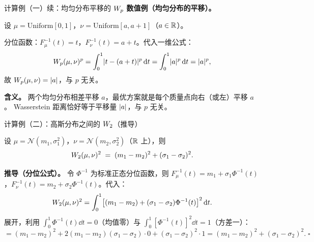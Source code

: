 \begin{frame}{计算例（一）续：均匀分布平移的 $W_{p}$}
  \textbf{数值例（均匀分布的平移）。}

  设 $\mu=\mathrm{Uniform}[0,1]$，$\nu=\mathrm{Uniform}[a,a+1]$（$a\in\mathbb{R}$）。

  分位函数：$F_{\mu}^{-1}(t)=t$，$F_{\nu}^{-1}(t)=a+t$。代入一维公式：
  \[
    W_{p}(\mu,\nu)^{p}
    = \int_{0}^{1}\lvert t-(a+t)\rvert^{p}\,\mathrm{d} t
    = \int_{0}^{1}\lvert a\rvert^{p}\,\mathrm{d} t
    = \lvert a\rvert^{p},
  \]
  故 $W_{p}(\mu,\nu)=\lvert a\rvert$，与 $p$ 无关。

  \textbf{含义。} 两个均匀分布相差平移 $a$，最优方案就是每个质量点向右（或左）平移 $a$。
  Wasserstein 距离恰好等于平移量 $\lvert a\rvert$，与 $p$ 无关。

\end{frame}

\begin{frame}{计算例（二）：高斯分布之间的 $W_{2}$（推导）}

  设 $\mu=\mathcal{N}(m_{1},\sigma_{1}^{2})$，$\nu=\mathcal{N}(m_{2},\sigma_{2}^{2})$（$\mathbb{R}$ 上），则
  \[
    W_{2}(\mu,\nu)^{2} \;=\; (m_{1}-m_{2})^{2} + (\sigma_{1}-\sigma_{2})^{2}.
  \]

  \textbf{推导（分位公式）。} 令 $\Phi^{-1}$ 为标准正态分位函数，则
  $F_{\mu}^{-1}(t)=m_{1}+\sigma_{1}\Phi^{-1}(t)$，$F_{\nu}^{-1}(t)=m_{2}+\sigma_{2}\Phi^{-1}(t)$。代入：
  \[
    W_{2}(\mu,\nu)^{2}
    = \int_{0}^{1}\bigl[(m_{1}-m_{2})+(\sigma_{1}-\sigma_{2})\Phi^{-1}(t)\bigr]^{2}\,\mathrm{d} t.
  \]
  展开，利用 $\int_{0}^{1}\Phi^{-1}(t)\dd t=0$（均值零）与 $\int_{0}^{1}[\Phi^{-1}(t)]^{2}\dd t=1$（方差一）：
  \[
    = (m_{1}-m_{2})^{2} + 2(m_{1}-m_{2})(\sigma_{1}-\sigma_{2})\cdot0
      + (\sigma_{1}-\sigma_{2})^{2}\cdot1
    = (m_{1}-m_{2})^{2} + (\sigma_{1}-\sigma_{2})^{2}.\;\square
  \]

\end{frame}

